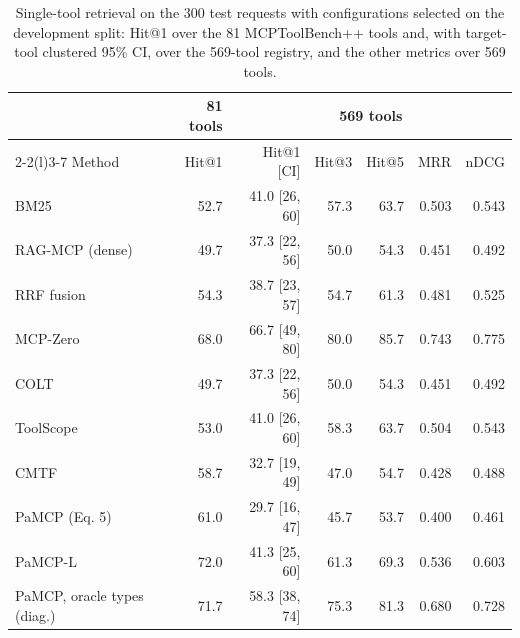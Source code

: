 \begin{table}[t]
\centering
\caption{Single-tool retrieval on the 300 test requests with configurations selected on the development split:
Hit@1 over the 81 MCPToolBench++ tools and, with target-tool clustered 95\% CI, over the 569-tool registry, and
the other metrics over 569 tools.}
\label{tab:ev-retrieval}
\scriptsize
\setlength{\tabcolsep}{2.4pt}
\begin{tabular}{@{}lrrrrrr@{}}
\toprule
 & 81 tools & \multicolumn{5}{c}{569 tools} \\
\cmidrule(lr){2-2}\cmidrule(l){3-7}
Method & Hit@1 & Hit@1 [CI] & Hit@3 & Hit@5 & MRR & nDCG \\
\midrule
BM25 & 52.7 & 41.0 [26, 60] & 57.3 & 63.7 & 0.503 & 0.543 \\
RAG-MCP (dense) & 49.7 & 37.3 [22, 56] & 50.0 & 54.3 & 0.451 & 0.492 \\
RRF fusion & 54.3 & 38.7 [23, 57] & 54.7 & 61.3 & 0.481 & 0.525 \\
MCP-Zero & 68.0 & 66.7 [49, 80] & 80.0 & 85.7 & 0.743 & 0.775 \\
COLT & 49.7 & 37.3 [22, 56] & 50.0 & 54.3 & 0.451 & 0.492 \\
ToolScope & 53.0 & 41.0 [26, 60] & 58.3 & 63.7 & 0.504 & 0.543 \\
CMTF & 58.7 & 32.7 [19, 49] & 47.0 & 54.7 & 0.428 & 0.488 \\
PaMCP (Eq. 5) & 61.0 & 29.7 [16, 47] & 45.7 & 53.7 & 0.400 & 0.461 \\
PaMCP-L & 72.0 & 41.3 [25, 60] & 61.3 & 69.3 & 0.536 & 0.603 \\
PaMCP, oracle types (diag.) & 71.7 & 58.3 [38, 74] & 75.3 & 81.3 & 0.680 & 0.728 \\
\bottomrule
\end{tabular}
\end{table}
